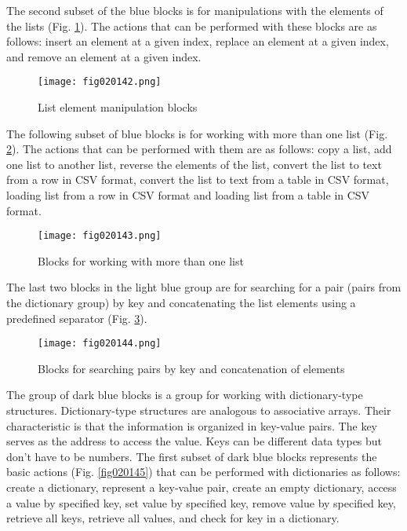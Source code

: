 The second subset of the blue blocks is for manipulations with the elements of the lists (Fig. \ref{fig020142}). The actions that can be performed with these blocks are as follows: insert an element at a given index, replace an element at a given index, and remove an element at a given index.

\begin{figure}[H]
   \centering
   \texttt{[image: fig020142.png]}
   \caption{List element manipulation blocks}
\label{fig020142}
\end{figure}

The following subset of blue blocks is for working with more than one list (Fig. \ref{fig020143}). The actions that can be performed with them are as follows: copy a list, add one list to another list, reverse the elements of the list, convert the list to text from a row in CSV format, convert the list to text from a table in CSV format, loading list from a row in CSV format and loading list from a table in CSV format.

\begin{figure}[H]
   \centering
   \texttt{[image: fig020143.png]}
   \caption{Blocks for working with more than one list}
\label{fig020143}
\end{figure}

The last two blocks in the light blue group are for searching for a pair (pairs from the dictionary group) by key and concatenating the list elements using a predefined separator (Fig. \ref{fig020144}).

\begin{figure}[H]
   \centering
   \texttt{[image: fig020144.png]}
   \caption{Blocks for searching pairs by key and concatenation of elements}
\label{fig020144}
\end{figure}

The group of dark blue blocks is a group for working with dictionary-type structures. Dictionary-type structures are analogous to associative arrays. Their characteristic is that the information is organized in key-value pairs. The key serves as the address to access the value. Keys can be different data types but don't have to be numbers. The first subset of dark blue blocks represents the basic actions (Fig. \ref{fig020145}) that can be performed with dictionaries as follows: create a dictionary, represent a key-value pair, create an empty dictionary, access a value by specified key, set value by specified key, remove value by specified key, retrieve all keys, retrieve all values, and check for key in a dictionary.


